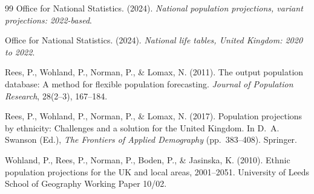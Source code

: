 \documentclass[12pt,a4paper]{article}
\begin{document}
\begin{thebibliography}{99}
Office for National Statistics. (2024).
\emph{National population projections, variant projections: 2022-based}.

Office for National Statistics. (2024).
\emph{National life tables, United Kingdom: 2020 to 2022}.

Rees, P., Wohland, P., Norman, P., \& Lomax, N. (2011).
The output population database: A method for flexible population forecasting.
\emph{Journal of Population Research}, 28(2--3), 167--184.

Rees, P., Wohland, P., Norman, P., \& Lomax, N. (2017).
Population projections by ethnicity: Challenges and a solution for the United Kingdom.
In D.~A. Swanson (Ed.), \emph{The Frontiers of Applied Demography} (pp.~383--408). Springer.

Wohland, P., Rees, P., Norman, P., Boden, P., \& Jasinska, K. (2010).
Ethnic population projections for the UK and local areas, 2001--2051.
University of Leeds School of Geography Working Paper 10/02.

\end{thebibliography}
\end{document}
